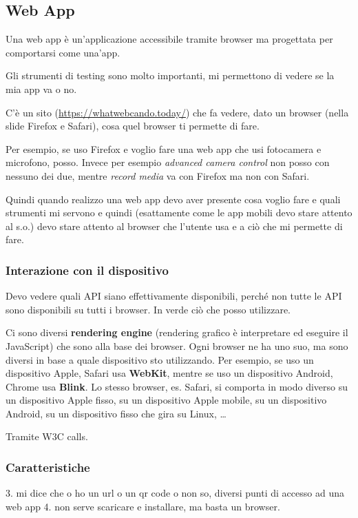 \subsection{Web App}
\par Una web app è un'applicazione accessibile tramite browser ma progettata per comportarsi come una'app.
\par Gli strumenti di testing sono molto importanti, mi permettono di vedere se la mia app va o no. 
\par C'è un sito (\url{https://whatwebcando.today/}) che fa vedere, dato un browser (nella slide Firefox e Safari), cosa quel browser ti permette di fare.
\par Per esempio, se uso Firefox e voglio fare una web app che usi fotocamera e microfono, posso. Invece per esempio \textit{advanced camera control} non posso con nessuno dei due, mentre \textit{record media} va con Firefox ma non con Safari.
\par Quindi quando realizzo una web app devo aver presente cosa voglio fare e quali strumenti mi servono e quindi (esattamente come le app mobili devo stare attento al s.o.) devo stare attento al browser che l'utente usa e a ciò che mi permette di fare.

\subsubsection{Interazione con il dispositivo}
\par Devo vedere quali API siano effettivamente disponibili, perché non tutte le API sono disponibili su tutti i browser. In verde ciò che posso utilizzare.
\par Ci sono diversi \textbf{rendering engine} (rendering grafico è interpretare ed eseguire il JavaScript) che sono alla base dei browser. Ogni browser ne ha uno suo, ma sono diversi in base a quale dispositivo sto utilizzando. Per esempio, se uso un dispositivo Apple, Safari usa \textbf{WebKit}, mentre se uso un dispositivo Android, Chrome usa \textbf{Blink}. Lo stesso browser, es. Safari, si comporta in modo diverso su un dispositivo Apple fisso, su un dispositivo Apple mobile, su un dispositivo Android, su un dispositivo fisso che gira su Linux, \dots
\par Tramite W3C calls.

\subsubsection{Caratteristiche}
3. mi dice che  o ho un url o un qr code o non so, diversi punti di accesso ad una web app 
4. non serve scaricare e installare, ma basta un browser.

